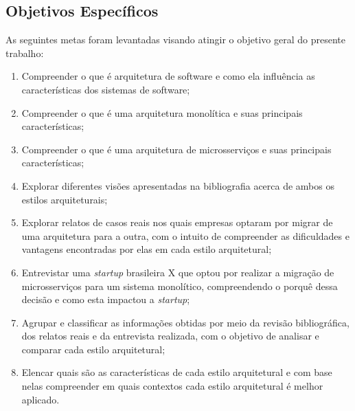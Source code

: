 \subsection{Objetivos Específicos}

As seguintes metas foram levantadas visando atingir o objetivo geral do presente
trabalho:

  \begin{enumerate}
      \item Compreender o que é arquitetura de software e como ela influência as características dos
          sistemas de software;
      \item Compreender o que é uma arquitetura monolítica e suas principais características;
      \item Compreender o que é uma arquitetura de microsserviços e suas principais características;
      \item Explorar diferentes visões apresentadas na bibliografia acerca de ambos os estilos
          arquiteturais;
      \item Explorar relatos de casos reais nos quais empresas optaram por migrar de uma arquitetura
          para a outra, com o intuito de compreender as dificuldades e vantagens encontradas por
          elas em cada estilo arquitetural;
      \item Entrevistar uma \textit{startup} brasileira X que optou por realizar a migração de
          microsserviços para um sistema monolítico, compreendendo o porquê dessa decisão e como
          esta impactou a \textit{startup};
      \item Agrupar e classificar as informações obtidas por meio da revisão bibliográfica, dos
          relatos reais e da entrevista realizada, com o objetivo de analisar e comparar cada estilo
          arquitetural;
      \item Elencar quais são as características de cada estilo arquitetural e com base nelas
          compreender em quais contextos cada estilo arquitetural é melhor aplicado.
  \end{enumerate}
